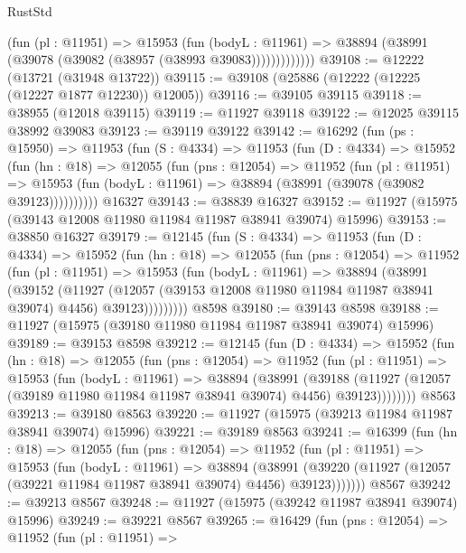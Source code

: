 \begin{lexlean}{RustStd}
\begin{coremodule}
                (fun (pl : @11951) =>
                @15953
                  (fun (bodyL : @11961) =>
                  @38894 (@38991 (@39078 (@39082 (@38957 (@38993 @39083)))))))))))))
@39108 := @12222 (@13721 (@31948 @13722))
@39115 := @39108 (@25886 (@12222 (@12225 (@12227 @1877 @12230)) @12005))
@39116 := @39105 @39115
@39118 := @38955 (@12018 @39115)
@39119 := @11927 @39118
@39122 := @12025 @39115 @38992 @39083
@39123 := @39119 @39122
@39142 := @16292
    (fun (ps : @15950) =>
    @11953
      (fun (S : @4334) =>
      @11953
        (fun (D : @4334) =>
        @15952
          (fun (hn : @18) =>
          @12055
            (fun (pns : @12054) =>
            @11952
              (fun (pl : @11951) =>
              @15953 (fun (bodyL : @11961) => @38894 (@38991 (@39078 (@39082 @39123))))))))))
    @16327
@39143 := @38839 @16327
@39152 := @11927 (@15975 (@39143 @12008 @11980 @11984 @11987 @38941 @39074) @15996)
@39153 := @38850 @16327
@39179 := @12145
    (fun (S : @4334) =>
    @11953
      (fun (D : @4334) =>
      @15952
        (fun (hn : @18) =>
        @12055
          (fun (pns : @12054) =>
          @11952
            (fun (pl : @11951) =>
            @15953
              (fun (bodyL : @11961) =>
              @38894
                (@38991
                  (@39152
                    (@11927
                      (@12057 (@39153 @12008 @11980 @11984 @11987 @38941 @39074) @4456)
                      @39123)))))))))
    @8598
@39180 := @39143 @8598
@39188 := @11927 (@15975 (@39180 @11980 @11984 @11987 @38941 @39074) @15996)
@39189 := @39153 @8598
@39212 := @12145
    (fun (D : @4334) =>
    @15952
      (fun (hn : @18) =>
      @12055
        (fun (pns : @12054) =>
        @11952
          (fun (pl : @11951) =>
          @15953
            (fun (bodyL : @11961) =>
            @38894
              (@38991
                (@39188
                  (@11927 (@12057 (@39189 @11980 @11984 @11987 @38941 @39074) @4456) @39123))))))))
    @8563
@39213 := @39180 @8563
@39220 := @11927 (@15975 (@39213 @11984 @11987 @38941 @39074) @15996)
@39221 := @39189 @8563
@39241 := @16399
    (fun (hn : @18) =>
    @12055
      (fun (pns : @12054) =>
      @11952
        (fun (pl : @11951) =>
        @15953
          (fun (bodyL : @11961) =>
          @38894
            (@38991
              (@39220 (@11927 (@12057 (@39221 @11984 @11987 @38941 @39074) @4456) @39123)))))))
    @8567
@39242 := @39213 @8567
@39248 := @11927 (@15975 (@39242 @11987 @38941 @39074) @15996)
@39249 := @39221 @8567
@39265 := @16429
    (fun (pns : @12054) =>
    @11952
      (fun (pl : @11951) =>

\end{coremodule}
\end{lexlean}
